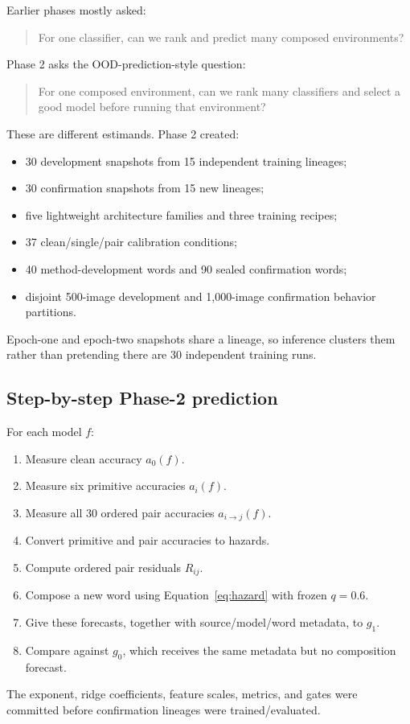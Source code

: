 \documentclass[11pt,a4paper]{article}
\begin{document}
Earlier phases mostly asked:
\begin{quote}
For one classifier, can we rank and predict many composed environments?
\end{quote}
Phase 2 asks the OOD-prediction-style question:
\begin{quote}
For one composed environment, can we rank many classifiers and select a good
model before running that environment?
\end{quote}
These are different estimands.  Phase 2 created:
\begin{itemize}
  \item 30 development snapshots from 15 independent training lineages;
  \item 30 confirmation snapshots from 15 new lineages;
  \item five lightweight architecture families and three training recipes;
  \item 37 clean/single/pair calibration conditions;
  \item 40 method-development words and 90 sealed confirmation words;
  \item disjoint 500-image development and 1,000-image confirmation behavior
  partitions.
\end{itemize}
Epoch-one and epoch-two snapshots share a lineage, so inference clusters them
rather than pretending there are 30 independent training runs.

\subsection{Step-by-step Phase-2 prediction}

For each model $f$:
\begin{enumerate}
  \item Measure clean accuracy $a_0(f)$.
  \item Measure six primitive accuracies $a_i(f)$.
  \item Measure all 30 ordered pair accuracies $a_{i\to j}(f)$.
  \item Convert primitive and pair accuracies to hazards.
  \item Compute ordered pair residuals $R_{ij}$.
  \item Compose a new word using Equation~\eqref{eq:hazard} with frozen
  $q=0.6$.
  \item Give these forecasts, together with source/model/word metadata, to
  $g_1$.
  \item Compare against $g_0$, which receives the same metadata but no
  composition forecast.
\end{enumerate}
The exponent, ridge coefficients, feature scales, metrics, and gates were
committed before confirmation lineages were trained/evaluated.
\end{document}
